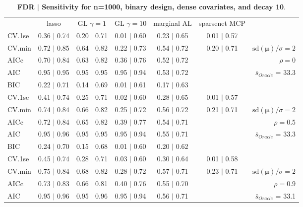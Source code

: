 \begin{table}\vspace{-.5cm}
\caption[l]{ {\it }
{ \bf FDR $\boldsymbol{\mid}$ Sensitivity for n=1000, binary design, dense covariates, and  decay  10}.}
\vspace{-.5cm}
\footnotesize{}
\begin{center}
\begin{tabular}{l*{5}{c}|r}
 & lasso & GL $\gamma=1$ & GL $\gamma=10$ & marginal AL & sparsenet MCP  & \\
 \cline{1-7}
CV.1se & 0.36 $\mid$ 0.74 & 0.20 $\mid$ 0.71 & 0.01 $\mid$ 0.60 & 0.23 $\mid$ 0.65 & 0.01 $\mid$ 0.57 & \\
CV.min & 0.72 $\mid$ 0.85 & 0.64 $\mid$ 0.82 & 0.22 $\mid$ 0.73 & 0.54 $\mid$ 0.72 & 0.20 $\mid$ 0.71 &  $\mathrm{sd}(\mathbf{\mu})/\sigma=2$ \\
AICc & 0.70 $\mid$ 0.84 & 0.63 $\mid$ 0.82 & 0.36 $\mid$ 0.76 & 0.52 $\mid$ 0.72 & & $\rho=0$ \\
AIC & 0.95 $\mid$ 0.95 & 0.95 $\mid$ 0.95 & 0.95 $\mid$ 0.94 & 0.53 $\mid$ 0.72 & &  \multirow{2}{*}{$\bar{s}_{Oracle}$ = 33.3} \\
BIC & 0.22 $\mid$ 0.71 & 0.14 $\mid$ 0.69 & 0.01 $\mid$ 0.61 & 0.17 $\mid$ 0.63 & &  \\
 \hline 
CV.1se & 0.41 $\mid$ 0.74 & 0.25 $\mid$ 0.71 & 0.02 $\mid$ 0.60 & 0.28 $\mid$ 0.65 & 0.01 $\mid$ 0.57 & \\
CV.min & 0.74 $\mid$ 0.84 & 0.66 $\mid$ 0.82 & 0.25 $\mid$ 0.72 & 0.56 $\mid$ 0.72 & 0.21 $\mid$ 0.71 &  $\mathrm{sd}(\mathbf{\mu})/\sigma=2$ \\
AICc & 0.72 $\mid$ 0.84 & 0.65 $\mid$ 0.82 & 0.39 $\mid$ 0.77 & 0.54 $\mid$ 0.71 & & $\rho=0.5$ \\
AIC & 0.95 $\mid$ 0.96 & 0.95 $\mid$ 0.95 & 0.95 $\mid$ 0.94 & 0.55 $\mid$ 0.71 & &  \multirow{2}{*}{$\bar{s}_{Oracle}$ = 33.3} \\
BIC & 0.24 $\mid$ 0.70 & 0.15 $\mid$ 0.68 & 0.01 $\mid$ 0.60 & 0.20 $\mid$ 0.62 & &  \\
 \hline 
CV.1se & 0.45 $\mid$ 0.74 & 0.28 $\mid$ 0.71 & 0.03 $\mid$ 0.60 & 0.30 $\mid$ 0.64 & 0.01 $\mid$ 0.58 & \\
CV.min & 0.75 $\mid$ 0.84 & 0.68 $\mid$ 0.82 & 0.28 $\mid$ 0.72 & 0.57 $\mid$ 0.71 & 0.23 $\mid$ 0.71 &  $\mathrm{sd}(\mathbf{\mu})/\sigma=2$ \\
AICc & 0.73 $\mid$ 0.83 & 0.66 $\mid$ 0.81 & 0.40 $\mid$ 0.76 & 0.55 $\mid$ 0.70 & & $\rho=0.9$ \\
AIC & 0.95 $\mid$ 0.96 & 0.95 $\mid$ 0.96 & 0.95 $\mid$ 0.94 & 0.56 $\mid$ 0.71 & &  \multirow{2}{*}{$\bar{s}_{Oracle}$ = 33.1} \\

\end{tabular}
\end{center}
\end{table}
